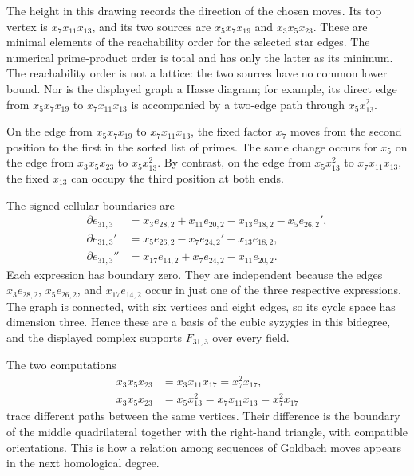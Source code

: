 \begin{example}
\begin{center}
\end{center}
The height in this drawing records the direction of the chosen
moves. Its top vertex is $x_7x_{11}x_{13}$, and its two sources are
$x_5x_7x_{19}$ and $x_3x_5x_{23}$. These are minimal elements
of the reachability order for the selected star edges. The numerical
prime-product order is total and has only the latter as its minimum.
The reachability order is not a lattice: the two sources have no common
lower bound. Nor is the displayed graph a Hasse diagram; for example,
its direct edge from $x_5x_7x_{19}$ to $x_7x_{11}x_{13}$ is
accompanied by a two-edge path through $x_5x_{13}^2$.

On the edge from $x_5x_7x_{19}$ to $x_7x_{11}x_{13}$, the fixed
factor $x_7$ moves from the second position to the first in the
sorted list of primes. The same change occurs for $x_5$ on the edge
from $x_3x_5x_{23}$ to $x_5x_{13}^2$. By contrast, on the edge
from $x_5x_{13}^2$ to $x_7x_{11}x_{13}$, the fixed $x_{13}$ can
occupy the third position at both ends.

The signed cellular boundaries are
\[
\begin{aligned}
 \partial e_{31,3}
   &=x_3e_{28,2}+x_{11}e_{20,2}-x_{13}e_{18,2}-x_5e_{26,2}',\\
 \partial e_{31,3}'
   &=x_5e_{26,2}-x_7e_{24,2}'+x_{13}e_{18,2},\\
 \partial e_{31,3}''
   &=x_{17}e_{14,2}+x_7e_{24,2}-x_{11}e_{20,2}.
\end{aligned}
\]
Each expression has boundary zero. They are independent because the
edges $x_3e_{28,2}$, $x_5e_{26,2}$, and $x_{17}e_{14,2}$ occur in just
one of the three respective expressions. The graph is connected,
with six vertices and eight edges, so its cycle space has dimension
three. Hence these are a basis of the cubic syzygies in this
bidegree, and the displayed complex supports $F_{31,3}$ over every
field.

The two computations
\[
\begin{aligned}
 x_3x_5x_{23}&=x_3x_{11}x_{17}=x_7^2x_{17},\\
 x_3x_5x_{23}&=x_5x_{13}^2=x_7x_{11}x_{13}=x_7^2x_{17}
\end{aligned}
\]
trace different paths between the same vertices. Their difference
is the boundary of the middle quadrilateral together with the right-hand triangle,
with compatible orientations. This is how a relation among sequences
of Goldbach moves appears in the next homological degree.
\end{example}



